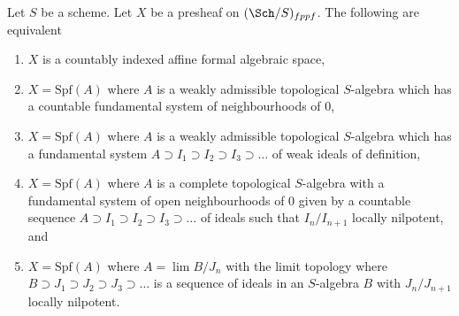 \begin{lemma}
\label{lemma-countably-indexed}
Let $S$ be a scheme. Let $X$ be a presheaf on $(\Sch/S)_{fppf}$.
The following are equivalent
\begin{enumerate}
\item $X$ is a countably indexed affine formal algebraic space,
\item $X = \text{Spf}(A)$ where $A$ is a weakly admissible topological
$S$-algebra which has a countable fundamental system of neighbourhoods of $0$,
\item $X = \text{Spf}(A)$ where $A$ is a weakly admissible topological
$S$-algebra which has a fundamental system
$A \supset I_1 \supset I_2 \supset I_3 \supset \ldots$
of weak ideals of definition,
\item $X = \text{Spf}(A)$ where $A$ is a complete topological $S$-algebra
with a fundamental system of open neighbourhoods of $0$ given by a
countable sequence $A \supset I_1 \supset I_2 \supset I_3 \supset \ldots$
of ideals such that $I_n/I_{n + 1}$ locally nilpotent, and
\item $X = \text{Spf}(A)$ where $A = \lim B/J_n$ with the limit topology
where $B \supset J_1 \supset J_2 \supset J_3 \supset \ldots$ is a
sequence of ideals in an $S$-algebra $B$ with $J_n/J_{n + 1}$
locally nilpotent.
\end{enumerate}
\end{lemma}

